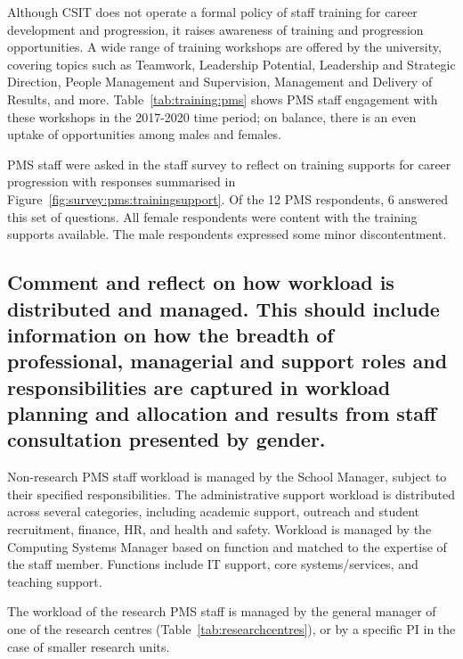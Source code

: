 

Although CSIT does not operate a formal policy of staff training for career development and progression, it raises awareness of training and progression opportunities. A wide range of training workshops are offered by the university, covering topics such as Teamwork, Leadership Potential, Leadership and Strategic Direction, People Management and Supervision, Management and Delivery of Results, and more.  Table~\ref{tab:training:pms} shows PMS staff engagement with these workshops in the 2017-2020 time period; on balance, there is an even uptake of opportunities among males and females. 






PMS staff were asked in the staff survey to reflect on training supports for career progression with responses summarised in Figure~\ref{fig:survey:pms:trainingsupport}. 
Of the 12 PMS respondents, 6 answered this set of questions.  All female respondents were content with the training supports available. The male respondents expressed some minor discontentment. 



\subsection{Comment and reflect on how workload is distributed and managed. This should include information on how the breadth of professional, managerial and support roles and responsibilities are captured in workload planning and allocation and results from staff consultation presented by gender.}



Non-research PMS staff workload is managed by the School Manager, subject to their specified responsibilities. The administrative support workload is distributed across
several categories, including academic support, outreach and student recruitment, finance, HR, and health and safety.
Workload is managed by the Computing Systems Manager based on function and matched to the expertise of the staff member.
Functions include IT support, core systems/services, and teaching support.



The workload of the research PMS staff is managed by the general manager of one of the research centres (Table~\ref{tab:researchcentres}), or by a specific \ac{PI} in the case of smaller research units. 



